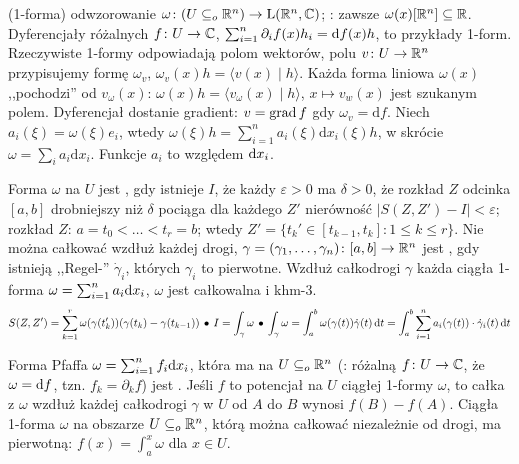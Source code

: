  (1-forma) odwzorowanie $\omega \colon (U \subseteq_o \mathbb{R}^n) \to \textrm{L}(\mathbb{R}^n, \mathbb{C})$; : zawsze $\omega(x)[\mathbb{R}^n] \subseteq \mathbb{R}$.
Dyferencjały różalnych $f \colon U \to \mathbb{C}$, $\sum_{i=1}^n \partial_i f(x)h_i = \textrm{d} f (x) h$, to przykłady 1-form.
Rzeczywiste 1-formy odpowiadają polom wektorów, polu $v \colon U \to \mathbb{R}^n$ przypisujemy formę $\omega_v$, $\omega_v(x) h = \langle v(x) \mid h \rangle$.
Każda forma liniowa $\omega(x)$ ,,pochodzi'' od $v_\omega(x)$: $\omega(x)h = \langle v_\omega(x) \mid h \rangle$, $x \mapsto v_w(x)$ jest szukanym polem.
Dyferencjał dostanie gradient: $v = \operatorname{grad} f$ gdy $\omega_v = \textrm{d}f$.
Niech $a_i(\xi) = \omega(\xi) e_i$, wtedy $\omega(\xi) h = \sum_{i=1}^n a_i(\xi) \textrm{d}x_i (\xi)h$, w skrócie $\omega = \sum_i a_i \textrm{d}x_i$.
Funkcje $a_i$ to  względem $\textrm{d} x_i$.

Forma  $\omega$ na $U$ jest , gdy istnieje $I$, że każdy $\varepsilon > 0$ ma $\delta > 0$, że rozkład $Z$ odcinka $[a, b]$ drobniejszy niż $\delta$ pociąga dla każdego $Z'$ nierówność $|S(Z, Z') - I| < \varepsilon$; rozkład $Z$: $a = t_0 < \dots < t_r = b$; wtedy $Z' = \{t_k' \in [t_{k-1}, t_k] : 1 \le k \le r\}$.
Nie można całkować wzdłuż każdej drogi, $\gamma = (\gamma_1, \ldots, \gamma_n) \colon [a, b] \to \mathbb{R}^n$ jest , gdy istnieją ,,Regel-'' $\dot \gamma_i$, których $\gamma_i$ to pierwotne.
Wzdłuż całkodrogi $\gamma$ każda ciągła 1-forma $\omega = \sum_{i=1}^n a_i \textrm{d} x_i$, $\omega$ jest całkowalna i khm-3.
\[
	S(Z, Z') = \sum_{k=1}^r \omega(\gamma(t_k'))(\gamma(t_k) - \gamma(t_{k-1})) \, \bullet \,
	I = \int_\gamma \omega \, \bullet \,
	\int_\gamma \omega = \int_a^b \omega(\gamma(t)) \dot \gamma (t) \,\textrm{d} t = \int_a^b \sum_{i=1}^n a_i(\gamma(t)) \cdot \dot{\gamma}_i (t) \,\textrm{d} t
\]

Forma  Pfaffa $\omega = \sum_{i = 1}^n f_i \textrm{d} x_i$, która ma na $U \subseteq_o \mathbb{R}^n$  (: różalną $f \colon U \to \mathbb{C}$, że $\omega = \textrm{d} f$, tzn. $f_k = \partial_k f$) jest .
Jeśli $f$ to potencjał na $U$ ciągłej 1-formy $\omega$, to całka z $\omega$ wzdłuż każdej całkodrogi $\gamma$ w $U$ od $A$ do $B$ wynosi $f(B) - f(A)$.
Ciągła 1-forma $\omega$ na obszarze $U \subseteq_o \mathbb{R}^n$, którą można całkować niezależnie od drogi, ma pierwotną: $f(x) = \int_a^x \omega$ dla $x \in U$.

